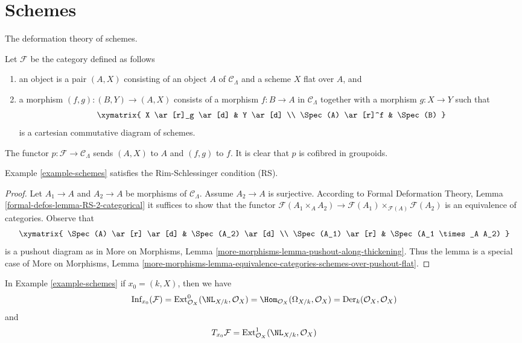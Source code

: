 \section{Schemes}
\label{section-schemes}

\noindent
The deformation theory of schemes.

\begin{example}[Schemes]
\label{example-schemes}
Let $\mathcal{F}$ be the category defined as follows
\begin{enumerate}
\item an object is a pair $(A, X)$ consisting of an
object $A$ of $\mathcal{C}_\Lambda$ and a scheme $X$ flat over $A$, and
\item a morphism $(f, g) : (B, Y) \to (A, X)$ consists of
a morphism $f : B \to A$ in $\mathcal{C}_\Lambda$ together
with a morphism $g : X \to Y$ such that
$$
\xymatrix{
X \ar[r]_g \ar[d] & Y \ar[d] \\
\Spec(A) \ar[r]^f & \Spec(B)
}
$$
is a cartesian commutative diagram of schemes.
\end{enumerate}
The functor $p : \mathcal{F} \to \mathcal{C}_\Lambda$ sends $(A, X)$
to $A$ and $(f, g)$ to $f$. It is clear that $p$ is cofibred in groupoids.
\end{example}

\begin{lemma}
\label{lemma-schemes-RS}
Example \ref{example-schemes}
satisfies the Rim-Schlessinger condition (RS).
\end{lemma}

\begin{proof}
Let $A_1 \to A$ and $A_2 \to A$ be morphisms of $\mathcal{C}_\Lambda$.
Assume $A_2 \to A$ is surjective. According to
Formal Deformation Theory, Lemma
\ref{formal-defos-lemma-RS-2-categorical}
it suffices to show that the functor
$\mathcal{F}(A_1 \times_A A_2) \to
\mathcal{F}(A_1) \times_{\mathcal{F}(A)} \mathcal{F}(A_2)$
is an equivalence of categories.
Observe that
$$
\xymatrix{
\Spec(A) \ar[r] \ar[d] & \Spec(A_2) \ar[d] \\
\Spec(A_1) \ar[r] &
\Spec(A_1 \times_A A_2)
}
$$
is a pushout diagram as in More on Morphisms, Lemma
\ref{more-morphisms-lemma-pushout-along-thickening}.
Thus the lemma is a special case of More on Morphisms, Lemma
\ref{more-morphisms-lemma-equivalence-categories-schemes-over-pushout-flat}.
\end{proof}

\begin{lemma}
\label{lemma-schemes-TI}
In Example \ref{example-schemes} if $x_0 = (k, X)$, then we have
$$
\text{Inf}_{x_0}(\mathcal{F}) =
\text{Ext}^0_{\mathcal{O}_X}(\NL_{X/k}, \mathcal{O}_X) =
\Hom_{\mathcal{O}_X}(\Omega_{X/k}, \mathcal{O}_X) =
\text{Der}_k(\mathcal{O}_X, \mathcal{O}_X)
$$
and
$$
T_{x_0}\mathcal{F} = \text{Ext}^1_{\mathcal{O}_X}(\NL_{X/k}, \mathcal{O}_X)
$$
\end{lemma}

